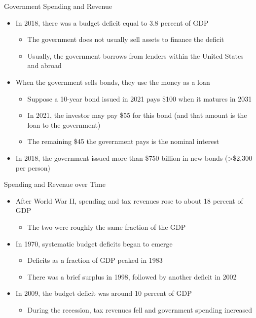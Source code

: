 \documentclass[aspectratio=1610]{beamer}
\begin{document}
\begin{frame}[wide]{Government Spending and Revenue}
	\begin{itemize}
		\item In 2018, there was a budget deficit equal to 3.8 percent of GDP
		\begin{itemize}
			\item The government does not usually sell assets to finance the deficit
			\item Usually, the government borrows from lenders within the United States and abroad
		\end{itemize}
		\item When the government sells bonds, they use the money as a loan
		\begin{itemize}
			\item Suppose a 10-year bond issued in 2021 pays \$100 when it matures in 2031
			\item In 2021, the investor may pay \$55 for this bond (and that amount is the loan to the government)
			\item The remaining \$45 the government pays is the nominal interest
		\end{itemize}
		\item In 2018, the government issued more than \$750 billion in new bonds (>\$2,300 per person)
	\end{itemize}
\end{frame}


\begin{frame}[wide]{Spending and Revenue over Time}
	\begin{itemize}
		\item After World War II, spending and tax revenues rose to about 18 percent of GDP
		\begin{itemize}
			\item The two were roughly the same fraction of the GDP
		\end{itemize}
		\item In 1970, systematic budget deficits began to emerge
		\begin{itemize}
			\item Deficits as a fraction of GDP peaked in 1983
			\item There was a brief surplus in 1998, followed by another deficit in 2002
		\end{itemize}
		\item In 2009, the budget deficit was around 10 percent of GDP
		\begin{itemize}
			\item During the recession, tax revenues fell and government spending increased
		\end{itemize}
	\end{itemize}
\end{frame}
\end{document}
